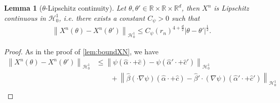 \documentclass[10pt,a4paper]{amsart}
\newtheorem{lemma}{Lemma}
\newcommand{\R}{\mathbb{R}}
\newcommand{\abs}[1]{\left|#1\right|} %
\newcommand{\cH}{\mathcal{H}}
\newcommand{\norm}[1]{\left\|#1 \right\|} %
\begin{document}
\begin{lemma}[$\theta$-Lipschitz continuity]
\label{lem:lip_Xtheta}
Let $\theta,\theta'\in \R\times\R\times\R^d$, then $X^n$ is Lipschitz continuous in $\cH_0^1$, \emph{i.e.} there exists a constant $C_\psi>0$ such that
\begin{align*}
    \norm{X^n(\theta) - X^n(\theta')}_{\cH_0^1} \le C_\psi \left(r_n\right)^{4+\frac{d}{2}}\abs{\theta-\theta'}^{\frac{1}{2}}.
\end{align*}
\end{lemma}

\begin{proof}
As in the proof of \cref{lem:boundXN}, we have
\begin{align}
\label{eq:appendix-bound}
\norm{X^n(\theta) - X^n\left( \theta'\right)}_{\cH_0^1} 
    &\le \norm{\psi \left( \hat\alpha \cdot + \hat c \right)-\psi \left( \hat\alpha' \cdot + \hat c'\right)}_{\cH_0^1} \nonumber \\ \nonumber
    &\qquad  +\norm{\hat\beta  \left( \cdot\nabla \psi \right) \left( \hat\alpha \cdot + \hat c \right)-\hat\beta' \cdot \left( \nabla \psi \right) \left( \hat\alpha' \cdot + \hat c' \right)}_{\cH_0^1} \\

\end{align}
\end{proof}
\end{document}
